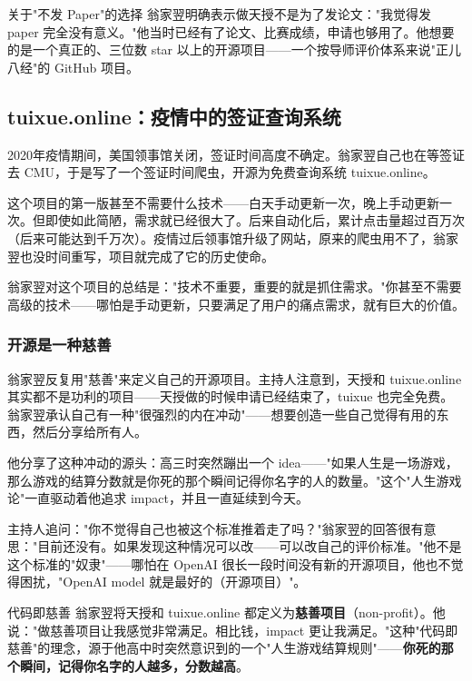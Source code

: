 \documentclass[a4paper]{article}
\begin{document}
\begin{warningbox}{关于"不发 Paper"的选择}
翁家翌明确表示做天授不是为了发论文："我觉得发 paper 完全没有意义。"他当时已经有了论文、比赛成绩，申请也够用了。他想要的是一个真正的、三位数 star 以上的开源项目——一个按导师评价体系来说"正儿八经"的 GitHub 项目。
\end{warningbox}

\subsection{tuixue.online：疫情中的签证查询系统}

2020年疫情期间，美国领事馆关闭，签证时间高度不确定。翁家翌自己也在等签证去 CMU，于是写了一个签证时间爬虫，开源为免费查询系统 tuixue.online。

这个项目的第一版甚至不需要什么技术——白天手动更新一次，晚上手动更新一次。但即使如此简陋，需求就已经很大了。后来自动化后，累计点击量超过百万次（后来可能达到千万次）。疫情过后领事馆升级了网站，原来的爬虫用不了，翁家翌也没时间重写，项目就完成了它的历史使命。

翁家翌对这个项目的总结是："技术不重要，重要的就是抓住需求。"你甚至不需要高级的技术——哪怕是手动更新，只要满足了用户的痛点需求，就有巨大的价值。

\subsubsection{开源是一种慈善}

翁家翌反复用"慈善"来定义自己的开源项目。主持人注意到，天授和 tuixue.online 其实都不是功利的项目——天授做的时候申请已经结束了，tuixue 也完全免费。翁家翌承认自己有一种"很强烈的内在冲动"——想要创造一些自己觉得有用的东西，然后分享给所有人。

他分享了这种冲动的源头：高三时突然蹦出一个 idea——"如果人生是一场游戏，那么游戏的结算分数就是你死的那个瞬间记得你名字的人的数量。"这个"人生游戏论"一直驱动着他追求 impact，并且一直延续到今天。

主持人追问："你不觉得自己也被这个标准推着走了吗？"翁家翌的回答很有意思："目前还没有。如果发现这种情况可以改——可以改自己的评价标准。"他不是这个标准的"奴隶"——哪怕在 OpenAI 很长一段时间没有新的开源项目，他也不觉得困扰，"OpenAI model 就是最好的（开源项目）"。

\begin{importantbox}{代码即慈善}
翁家翌将天授和 tuixue.online 都定义为\textbf{慈善项目}（non-profit）。他说："做慈善项目让我感觉非常满足。相比钱，impact 更让我满足。"这种"代码即慈善"的理念，源于他高中时突然意识到的一个"人生游戏结算规则"——\textbf{你死的那个瞬间，记得你名字的人越多，分数越高}。
\end{importantbox}
\end{document}
